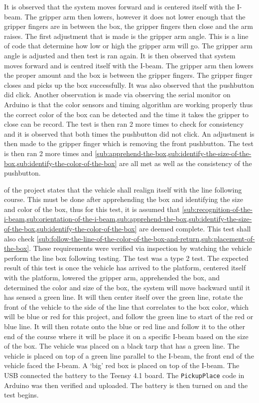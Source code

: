\documentclass[11pt]{report}
\begin{document}
It is observed that the system moves forward and is centered itself with the I-beam. The gripper arm then lowers, however it does not lower enough that the gripper fingers are in between the box, the gripper fingers then close and the arm raises. The first adjustment that is made is the gripper arm angle. This is a line of code that determine how low or high the gripper arm will go. The gripper arm angle is adjusted and then test is ran again. It is then observed that system moves forward and is centred itself with the I-beam. The gripper arm then lowers the proper amount and the box is between the gripper fingers. The gripper finger closes and picks up the box successfully. It was also observed that the pushbutton did click. Another observation is made via observing the serial monitor on Arduino is that the color sensors and timing algorithm are working properly thus the correct color of the box can be detected and the time it takes the gripper to close can be record. The test is then ran 2 more times to check for consistency and it is observed that both times the pushbutton did not click. An adjustment is then made to the gripper finger which is removing the front pushbutton. The test is then ran 2 more times and 
\cref{sub:apprehend-the-box,sub:identify-the-size-of-the-box,sub:identify-the-color-of-the-box} are all met as well as the consistency of the pushbutton.

\label{tst:line-box-following}
 of the project states that the vehicle shall realign itself with the line following course. This must be done after apprehending the box and identifying the size and color of the box, thus for this test, it is assumed that \cref{sub:recognition-of-the-i-beam,sub:orientation-of-the-i-beam,sub:apprehend-the-box,sub:identify-the-size-of-the-box,sub:identify-the-color-of-the-box} are deemed complete. This test shall also check \cref{sub:follow-the-line-of-the-color-of-the-box-and-return,sub:placement-of-the-box}. These requirements were verified via inspection by watching the vehicle perform the line box following testing. The test was a type 2 test. The expected result of this test is once the vehicle has arrived to the platform, centered itself with the platform, lowered the gripper arm, apprehended the box, and determined the color and size of the box, the system will move backward until it has sensed a green line. It will then center itself over the green line, rotate the front of the vehicle to the side of the line that correlates to the box color, which will be blue or red for this project, and follow the green line to start of the red or blue line. It will then rotate onto the blue or red line and follow it to the other end of the course where it will be place it on a specific I-beam based on the size of the box. The vehicle was placed on a black tarp that has a green line. The vehicle is placed on top of a green line parallel to the I-beam, the front end of the vehicle faced the I-beam. A ‘big’ red box is placed on top of the I-beam. The USB connected the battery to the Teensy 4.1 board. The \texttt{PickupPlace} code in Arduino was then verified and uploaded. The battery is then turned on and the test begins. 
\end{document}
